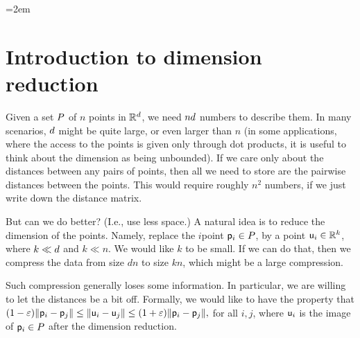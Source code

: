 

%
\providecommand{\markX}[2]{%
  \begingroup\color{purple}%
  \ifmmode\underbrace{#2}_{\text{\normalfont\scriptsize[#1]}}%
  \else#2\textsuperscript{\normalfont\scriptsize[#1]}\fi\endgroup}
\providecommand{\noteX}[2]{%
  \par\smallskip\noindent{\color{purple}\textbf{[#1]} #2}\par\smallskip}
\emergencystretch=2em %




\ChapterPrefix{}
\ChapterGen{}


\section{Introduction to dimension reduction}

Given a set $P$ of $n$ points in $\mathbb{R}^d$, we need $nd$
numbers to describe them. In many scenarios, $d$ might be quite
large, or even larger than $n$ (in some applications, where the access
to the points is given only through dot products, it is useful to think
about the dimension as being unbounded). If we care only about the
distances between any pairs of points, then all we need to store are
the pairwise distances between the points. This would require roughly
$n^2$ numbers, if we just write down the distance matrix.

But can we do better? (I.e., use less space.) A natural idea is to
reduce the dimension of the points. Namely, replace the $i$\th point
$\mathsf{p}_i \in P$, by a point $\mathsf{u}_i \in \mathbb{R}^k$, where $k \ll d$
and $k \ll n$. We would like $k$ to be small. If we can do that, then
we compress the data from size $dn$ to size $kn$, which might be a
large compression.

Such compression generally loses some information. In particular, we are willing to let the distances be a bit off. Formally, we would like to have the property that
\begin{math}
    (1-\eps)\|{\pnt_i - \pnt_j}\|%
    \leq%
    \|{\pntA_i - \pntA_j}\|%
    \leq%
    (1+\eps)\|{\pnt_i - \pnt_j}\|,
\end{math}
for all $i,j$, where $\mathsf{u}_i$ is the image of $\mathsf{p}_i \in P$ after
the dimension reduction.

